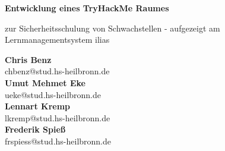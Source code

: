 \documentclass[10pt, a4paper,onecolumn ,titlepage]{article}
\begin{document}
    \begin{titlepage}
        \begin{center}

            \vspace*{1cm}

            {\large \textbf{Entwicklung eines TryHackMe Raumes}}

            \vspace{0.5cm}
            zur Sicherheitsschulung von Schwachstellen - aufgezeigt am Lernmanagementsystem \ac{ilias}

            \vspace{1.5cm}

            \textbf{Chris Benz} \\
            \small{chbenz@stud.hs-heilbronn.de}
            \\
            \vspace{0.2cm}
            \textbf{Umut Mehmet Eke}\\
            \small{ueke@stud.hs-heilbronn.de}
            \\
            \vspace{0.2cm}
            \textbf{Lennart Kremp} \\
            \small{lkremp@stud.hs-heilbronn.de}
            \\
            \vspace{0.2cm}
            \textbf{Frederik Spieß}\\
            \small{frspiess@stud.hs-heilbronn.de}


            \vfill


\end{center}
\end{titlepage}
\end{document}
